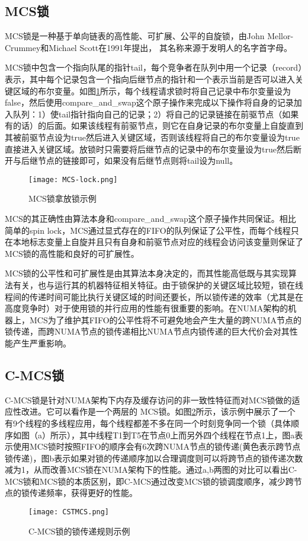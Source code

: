 \subsection{MCS锁}
MCS锁是一种基于单向链表的高性能、可扩展、公平的自旋锁，由John Mellor-Crummey和Michael Scott在1991年提出， 其名称来源于发明人的名字首字母。

MCS锁中包含一个指向队尾的指针tail，每个竞争者在队列中用一个记录（record）表示，其中每个记录包含一个指向后继节点的指针和一个表示当前是否可以进入关键区域的布尔变量。如图\ref{Fig:MCS}所示，每个线程请求锁时将自己记录中布尔变量设为false，然后使用compare\_and\_swap这个原子操作来完成以下操作将自身的记录加入队列：1）使tail指针指向自己的记录；2）将自己的记录链接在前驱节点（如果有的话）的后面。如果该线程有前驱节点，则它在自身记录的布尔变量上自旋直到其被前驱节点设为true然后进入关键区域，否则该线程将自己的布尔变量设为true直接进入关键区域。放锁时只需要将后继节点的记录中的布尔变量设为true然后断开与后继节点的链接即可，如果没有后继节点则将tail设为null。
\begin{figure}[t]
	\centering
	\texttt{[image: MCS-lock.png]}
	\caption{MCS锁拿放锁示例}
	\label{Fig:MCS}
\end{figure}

MCS的其正确性由算法本身和compare\_and\_swap这个原子操作共同保证。相比简单的spin lock，MCS通过显式存在的FIFO的队列保证了公平性，而每个线程只在本地标志变量上自旋并且只有自身和前驱节点对应的线程会访问该变量则保证了MCS锁的高性能和良好的可扩展性。

MCS锁的公平性和可扩展性是由其算法本身决定的，而其性能高低既与其实现算法有关，也与运行其的机器特征相关特征。由于锁保护的关键区域比较短，锁在线程间的传递时间可能比执行关键区域的时间还要长\cite{johnson2010decoupling}，所以锁传递的效率（尤其是在高度竞争时）对于使用锁的并行应用的性能有很重要的影响。在NUMA架构的机器上，MCS为了维护其FIFO的公平性将不可避免地会产生大量的跨NUMA节点的锁传递，而跨NUMA节点的锁传递相比NUMA节点内锁传递的巨大代价会对其性能产生严重影响。

\subsection{C-MCS锁}
C-MCS锁是针对NUMA架构下内存及缓存访问的非一致性特征而对MCS锁做的适应性改进。它可以看作是一个两层的 MCS锁。如图\ref{Fig:CSTMCS}所示，该示例中展示了一个有9个线程的多线程应用，每个线程都差不多在同一个时刻竞争同一个锁（具体顺序如图（a）所示），其中线程T1到T5在节点0上而另外四个线程在节点1上，图a表示使用MCS锁时按照FIFO的顺序会有6次跨NUMA节点的锁传递(黄色表示跨节点锁传递)，图b表示如果对锁的传递顺序加以合理调度则可以将跨节点的锁传递次数减为1，从而改善MCS锁在NUMA架构下的性能。通过a,b两图的对比可以看出C-MCS锁和MCS锁的本质区别，即C-MCS通过改变MCS锁的锁调度顺序，减少跨节点的锁传递频率，获得更好的性能。
\begin{figure}[t]
	\centering
	\texttt{[image: CSTMCS.png]}
	\caption{C-MCS锁的锁传递规则示例}
	\label{Fig:CSTMCS}
\end{figure}


